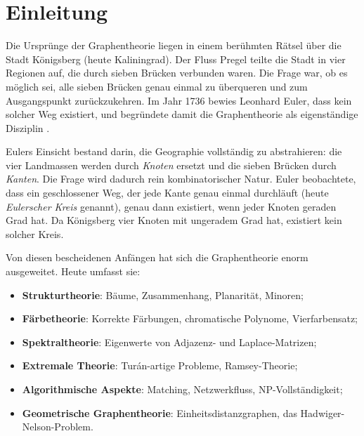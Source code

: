 \documentclass[12pt,a4paper]{amsart}
\theoremstyle{definition}
\theoremstyle{remark}
\begin{document}
\tableofcontents

\section{Einleitung}

Die Ursprünge der Graphentheorie liegen in einem berühmten Rätsel über die
Stadt Königsberg (heute Kaliningrad). Der Fluss Pregel teilte die Stadt in vier
Regionen auf, die durch sieben Brücken verbunden waren. Die Frage war, ob es
möglich sei, alle sieben Brücken genau einmal zu überqueren und zum Ausgangs\-punkt
zurückzukehren. Im Jahr 1736 bewies Leonhard Euler, dass kein solcher Weg
existiert, und begründete damit die Graphentheorie als eigenständige Disziplin
\cite{euler1736}.

Eulers Einsicht bestand darin, die Geographie vollständig zu abstrahieren:
die vier Landmassen werden durch \emph{Knoten} ersetzt und die sieben Brücken
durch \emph{Kanten}. Die Frage wird dadurch rein kombinatorischer Natur.
Euler beobachtete, dass ein geschlossener Weg, der jede Kante genau einmal
durchläuft (heute \emph{Eulerscher Kreis} genannt), genau dann existiert,
wenn jeder Knoten geraden Grad hat. Da Königsberg vier Knoten mit ungeradem
Grad hat, existiert kein solcher Kreis.

Von diesen bescheidenen Anfängen hat sich die Graphentheorie enorm ausgeweitet.
Heute umfasst sie:
\begin{itemize}[leftmargin=2em]
  \item \textbf{Strukturtheorie}: Bäume, Zusammenhang, Planarität, Minoren;
  \item \textbf{Färbetheorie}: Korrekte Färbungen, chromatische Polynome,
        Vierfarbensatz;
  \item \textbf{Spektraltheorie}: Eigenwerte von Adjazenz- und
        Laplace-Matrizen;
  \item \textbf{Extremale Theorie}: Turán-artige Probleme, Ramsey-Theorie;
  \item \textbf{Algorithmische Aspekte}: Matching, Netzwerkfluss, NP-Vollständigkeit;
  \item \textbf{Geometrische Graphentheorie}: Einheitsdistanzgraphen, das
        Hadwiger-Nelson-Problem.
\end{itemize}
\end{document}
